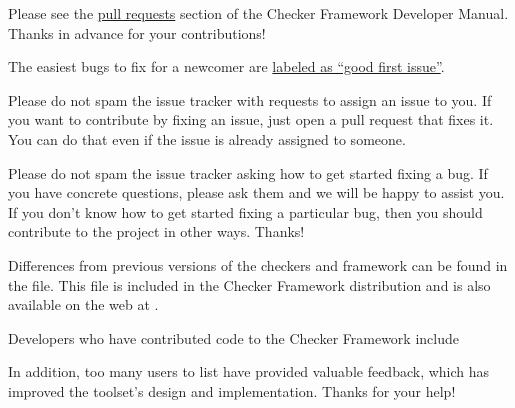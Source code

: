 
Please see the
\href{https://htmlpreview.github.io/?https://github.com/eisop/checker-framework/master/docs/developer/developer-manual.html#pull-requests}{pull
  requests} section of the Checker Framework Developer Manual.
Thanks in advance for your contributions!

The easiest bugs to fix for a newcomer are
\href{https://github.com/eisop/checker-framework/issues?q=is\%3Aopen+is\%3Aissue+label\%3A\%22good+first+issue\%22}{labeled
  as ``good first issue''}.

Please do not spam the issue tracker with requests to assign an issue to
you.  If you want to contribute by fixing an issue, just open a pull
request that fixes it.  You can do that even if the issue is already
assigned to someone.

Please do not spam the issue tracker asking how to get started fixing a
bug.  If you have concrete questions, please ask them and we will be happy
to assist you.  If you don't know how to get started fixing a particular
bug, then you should contribute to the project in other ways.  Thanks!



Differences from previous versions of the checkers and framework can be found
in the  file.  This file is included in the
Checker Framework distribution and is also available on the web at
.

Developers who have contributed code to the Checker Framework include


In addition, too many users to list have provided valuable feedback, which
has improved the toolset's design and implementation.
Thanks for your help!



